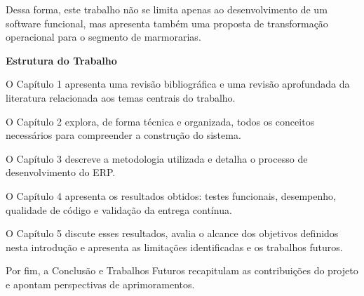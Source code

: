 Dessa forma, este trabalho não se limita apenas ao desenvolvimento de um software funcional, mas apresenta também uma proposta de transformação operacional para o segmento de marmorarias.

\vspace{0.5cm}
\textbf{Estrutura do Trabalho}
\vspace{0.5cm}

O Capítulo 1 apresenta uma revisão bibliográfica e uma revisão aprofundada da literatura relacionada aos temas centrais do trabalho.

O Capítulo 2 explora, de forma técnica e organizada, todos os conceitos necessários para compreender a construção do sistema.

O Capítulo 3 descreve a metodologia utilizada e detalha o processo de desenvolvimento do ERP.

O Capítulo 4 apresenta os resultados obtidos: testes funcionais, desempenho, qualidade de código e validação da entrega contínua.

O Capítulo 5 discute esses resultados, avalia o alcance dos objetivos definidos nesta introdução e apresenta as limitações identificadas e os trabalhos futuros.

Por fim, a Conclusão e Trabalhos Futuros recapitulam as contribuições do projeto e apontam perspectivas de aprimoramentos.




\vspace{10mm} %

